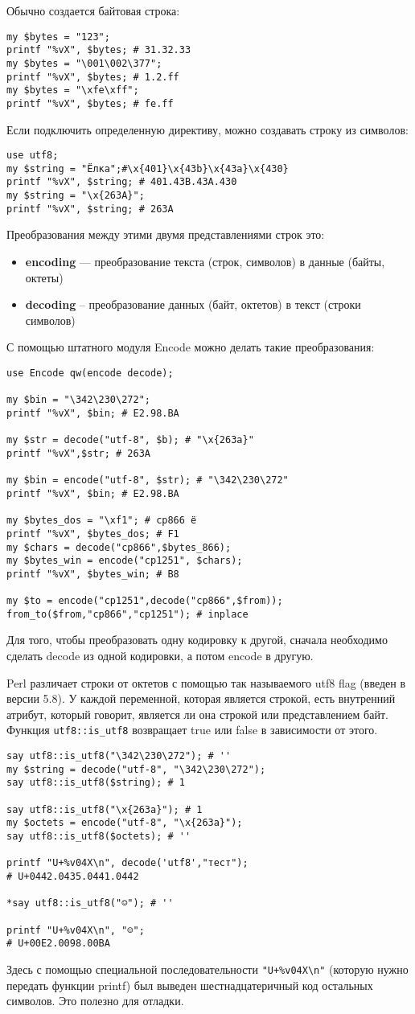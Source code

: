 Обычно создается байтовая строка:
\begin{verbatim}
my $bytes = "123";
printf "%vX", $bytes; # 31.32.33
my $bytes = "\001\002\377";
printf "%vX", $bytes; # 1.2.ff
my $bytes = "\xfe\xff";
printf "%vX", $bytes; # fe.ff
\end{verbatim}
Если подключить определенную директиву, можно создавать строку из символов:
\begin{verbatim}
use utf8;
my $string = "Ёлка";#\x{401}\x{43b}\x{43a}\x{430}
printf "%vX", $string; # 401.43B.43A.430
my $string = "\x{263A}";
printf "%vX", $string; # 263A
\end{verbatim}
Преобразования между этими двумя представлениями строк это:
\begin{itemize}
    \item \textbf{encoding} --- преобразование текста (строк, символов) в данные (байты, октеты)
    \item \textbf{decoding} -- преобразование данных (байт, октетов) в текст (строки символов)
\end{itemize}
С помощью штатного модуля Encode можно делать такие преобразования:
\begin{verbatim}
use Encode qw(encode decode);

my $bin = "\342\230\272";
printf "%vX", $bin; # E2.98.BA

my $str = decode("utf-8", $b); # "\x{263a}"
printf "%vX",$str; # 263A

my $bin = encode("utf-8", $str); # "\342\230\272"
printf "%vX", $bin; # E2.98.BA

my $bytes_dos = "\xf1"; # cp866 ё
printf "%vX", $bytes_dos; # F1
my $chars = decode("cp866",$bytes_866);
my $bytes_win = encode("cp1251", $chars);
printf "%vX", $bytes_win; # B8

my $to = encode("cp1251",decode("cp866",$from));
from_to($from,"cp866","cp1251"); # inplace
\end{verbatim}
Для того, чтобы преобразовать одну кодировку к другой, сначала необходимо сделать decode из одной кодировки, а потом encode в другую.

Perl различает строки от октетов с помощью так называемого utf8 flag (введен в версии 5.8). У каждой переменной, которая является строкой, есть внутренний атрибут, который говорит, является ли она строкой или представлением байт. Функция \verb|utf8::is_utf8| возвращает true или false в зависимости от этого.
\begin{verbatim}
say utf8::is_utf8("\342\230\272"); # ''
my $string = decode("utf-8", "\342\230\272");
say utf8::is_utf8($string); # 1

say utf8::is_utf8("\x{263a}"); # 1
my $octets = encode("utf-8", "\x{263a}");
say utf8::is_utf8($octets); # ''

printf "U+%v04X\n", decode('utf8',"тест");
# U+0442.0435.0441.0442

*say utf8::is_utf8("☺"); # ''

printf "U+%v04X\n", "☺";
# U+00E2.0098.00BA
\end{verbatim}
Здесь с помощью специальной последовательности \verb|"U+%v04X\n"| (которую нужно передать функции printf) был выведен шестнадцатеричный код остальных символов. Это полезно для отладки.

